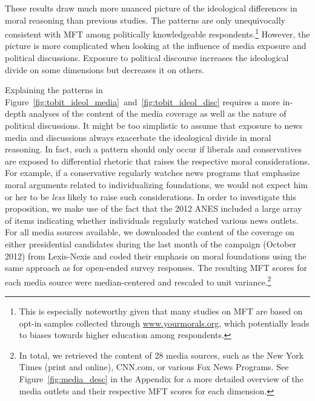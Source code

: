 \documentclass[12pt]{article}
\begin{document}
These results draw much more nuanced picture of the ideological differences in moral reasoning than previous studies. The patterns are only unequivocally consistent with MFT among politically knowledgeable respondents.\footnote{This is especially noteworthy given that many studies on MFT are based on opt-in samples collected through \url{www.yourmorals.org}, which potentially leads to biases towards higher education among respondents.} However, the picture is more complicated when looking at the influence of media exposure and political discussions. Exposure to political discourse increases the ideological divide on some dimensions but decreases it on others.

Explaining the patterns in Figure~\ref{fig:tobit_ideol_media}~and~\ref{fig:tobit_ideol_disc} requires a more in-depth analyses of the content of the media coverage as well as the nature of political discussions. It might be too simplistic to assume that exposure to news media and discussions always exacerbate the ideological divide in moral reasoning. In fact, such a pattern should only occur if liberals and conservatives are exposed to differential rhetoric that raises the respective moral considerations. For example, if a conservative regularly watches news programs that emphasize moral arguments related to individualizing foundations, we would not expect him or her to be \textit{less} likely to raise such considerations. In order to investigate this proposition, we make use of the fact that the 2012 ANES included a large array of items indicating whether individuals regularly watched various news outlets. For all media sources available, we downloaded the content of the coverage on either presidential candidates during the last month of the campaign (October 2012) from Lexis-Nexis and coded their emphasis on moral foundations using the same approach as for open-ended survey responses. The resulting MFT scores for each media source were median-centered and rescaled to unit variance.\footnote{In total, we retrieved the content of 28 media sources, such as the New York Times (print and online), CNN.com, or various Fox News Programs. See Figure~\ref{fig:media_desc} in the Appendix for a more detailed overview of the media outlets and their respective MFT scores for each dimension.} 
\end{document}
